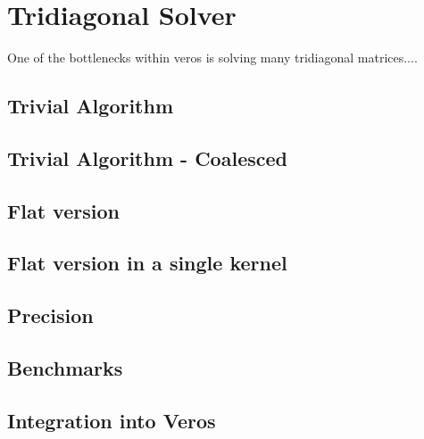 \documentclass[a4paper,oneside]{memoir}
\begin{document}
\section{Tridiagonal Solver}
One of the bottlenecks within veros is solving many tridiagonal matrices.... 
\subsection{Trivial Algorithm}
\subsection{Trivial Algorithm - Coalesced}
\subsection{Flat version}
\subsection{Flat version in a single kernel}
\subsection{Precision}
\subsection{Benchmarks}
\subsection{Integration into Veros}
\end{document}
